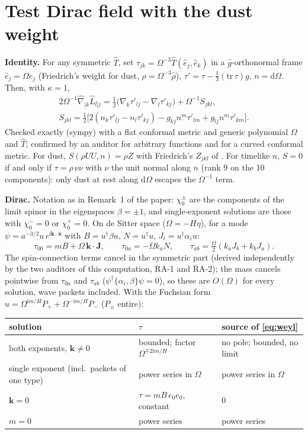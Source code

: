 \documentclass[11pt,a4paper]{article}
\newcommand{\dd}{\mathrm{d}}
\newcommand{\ii}{\mathrm{i}}
\begin{document}
\section{Test Dirac field with the dust weight}
\label{sec:rj}
\textbf{Identity.} For any symmetric $\hat T$, set $\tau_{jk}=\Omega^{-3}\hat T(\hat e_{j},\hat e_{k})$ in a $\hat g$-orthonormal frame $\hat e_{j}=\Omega e_{j}$ (Friedrich's weight for dust, $\rho=\Omega^{-3}\hat\rho$), $\tau'=\tau-\tfrac13(\mathrm{tr}\,\tau)g$, $n=\dd\Omega$. Then, with $\kappa=1$,
\begin{gather}
2\Omega^{-1}\hat\nabla_{[k}\hat L_{l]j}=\tfrac12\big(\nabla_{k}\tau'_{lj}-\nabla_{l}\tau'_{kj}\big)+\Omega^{-1}S_{jkl},\\
S_{jkl}=\tfrac12\big[2(n_{k}\tau'_{lj}-n_{l}\tau'_{kj})-g_{kj}n^{m}\tau'_{lm}+g_{lj}n^{m}\tau'_{km}\big].
\end{gather}
Checked exactly (sympy) with a flat conformal metric and generic polynomial $\Omega$ and $\hat T$; confirmed by an auditor for arbitrary functions and for a curved conformal metric. For dust, $S(\rho UU,n)=\rho Z$ with Friedrich's $Z_{jkl}$ of \cite[(3.20)]{Friedrich2017}. For timelike $n$, $S=0$ if and only if $\tau=\rho\,\nu\nu$ with $\nu$ the unit normal along $n$ (rank 9 on the 10 components): only dust at rest along $\dd\Omega$ escapes the $\Omega^{-1}$ term.

\textbf{Dirac.} Notation as in Remark~1 of the paper: $\chi_{0}^{\pm}$ are the components of the limit spinor in the eigenspaces $\beta=\pm1$, and single-exponent solutions are those with $\chi_{0}^{-}=0$ or $\chi_{0}^{+}=0$. On de Sitter space ($\Omega=-H\eta$), for a mode $\psi=a^{-3/2}u\,e^{\ii\mathbf{k}\cdot\mathbf{x}}$ with $B=u^{\dagger}\beta u$, $N=u^{\dagger}u$, $J_{i}=u^{\dagger}\alpha_{i}u$:
\begin{equation}
\tau_{00}=mB+\Omega\,\mathbf{k}\cdot\mathbf{J},\qquad \tau_{0a}=-\Omega k_{a}N,\qquad \tau_{ab}=\tfrac{\Omega}{2}(k_{a}J_{b}+k_{b}J_{a}).
\end{equation}
The spin-connection terms cancel in the symmetric part (derived independently by the two auditors of this computation, RA-1 and RA-2); the mass cancels pointwise from $\tau_{0a}$ and $\tau_{ab}$ ($\psi^{\dagger}\{\alpha_{i},\beta\}\psi=0$), so these are $O(\Omega)$ for every solution, wave packets included. With the Fuchsian form $u=\Omega^{\ii m/H}P_{+}+\Omega^{-\ii m/H}P_{-}$ ($P_{\pm}$ entire):

\begin{center}\small
\begin{tabular}{lll}
\toprule
solution & $\tau$ & source of \eqref{eq:weyl}\\
\midrule
both exponents, $\mathbf{k}\neq0$ & bounded; factor $\Omega^{\mp2\ii m/H}$ & no pole; bounded, no limit\\
single exponent (incl.\ packets of one type) & power series in $\Omega$ & power series in $\Omega$\\
$\mathbf{k}=0$ & $\tau=mB\,e_{0}e_{0}$, constant & $0$\\
$m=0$ & power series & power series\\
\bottomrule
\end{tabular}
\end{center}
\end{document}
